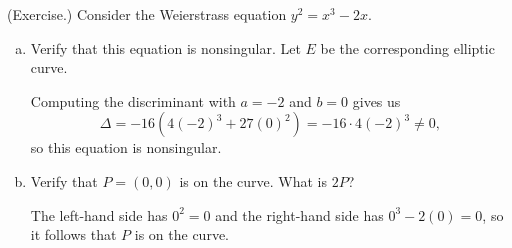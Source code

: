 \documentclass[letterpaper]{article}
\begin{document}
\begin{mdframed}
    (Exercise.) Consider the Weierstrass equation $y^2 = x^3 - 2x$. 

    \begin{enumerate}[(a)]
        \item Verify that this equation is nonsingular. Let $E$ be the corresponding elliptic curve. 
        \begin{mdframed}
            Computing the discriminant with $a = -2$ and $b = 0$ gives us
            \[\Delta = -16(4(-2)^3 + 27(0)^2) = -16 \cdot 4(-2)^3 \neq 0,\]
            so this equation is nonsingular. 
        \end{mdframed}
        \item Verify that $P = (0, 0)$ is on the curve. What is $2P$? 
        \begin{mdframed}
            The left-hand side has $0^2 = 0$ and the right-hand side has $0^3 - 2(0) = 0$, so it follows that $P$ is on the curve. 

            \bigskip 


\end{mdframed}
\end{enumerate}
\end{mdframed}
\end{document}
